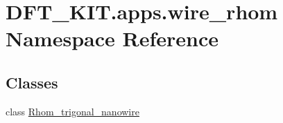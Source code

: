 \hypertarget{namespace_d_f_t___k_i_t_1_1apps_1_1wire__rhom}{\section{D\+F\+T\+\_\+\+K\+I\+T.\+apps.\+wire\+\_\+rhom Namespace Reference}
\label{namespace_d_f_t___k_i_t_1_1apps_1_1wire__rhom}
}
\subsection*{Classes}
\begin{DoxyCompactItemize}
\item 
class \hyperlink{class_d_f_t___k_i_t_1_1apps_1_1wire__rhom_1_1_rhom__trigonal__nanowire}{Rhom\+\_\+trigonal\+\_\+nanowire}
\end{DoxyCompactItemize}
